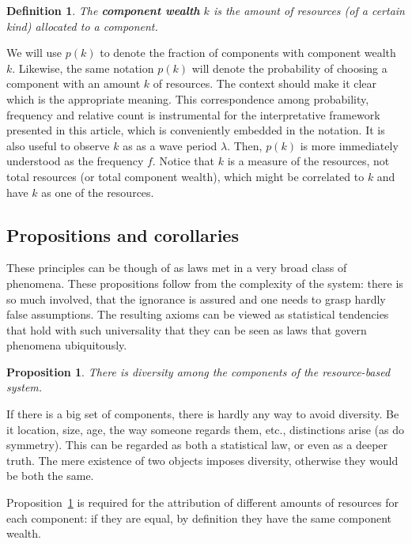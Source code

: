 \documentclass[a4paper, 11pt]{article} %
\newtheorem{proposition}[theorem]{Proposition}
\newtheorem{definition2}[theorem3]{Definition}
\begin{document}
\begin{definition2}
	The {\bf component wealth} $k$ is the amount of resources (of a certain kind) allocated to a component.
\end{definition2}

We will use $p(k)$ to denote the fraction of components with component wealth $k$.
Likewise, the same notation $p(k)$ will denote the probability of choosing a component with an amount $k$ of resources.
The context should make it clear which is the appropriate meaning.
This correspondence among probability, frequency and relative count is
instrumental for the interpretative framework presented in this article,
which is conveniently embedded in the notation.
It is also useful to observe 
$k$ as as a wave period $\lambda$.
Then, $p(k)$ is more immediately understood as 
the frequency $f$.
Notice that $k$ is a measure of the resources,
not total resources (or total component wealth), which
might be correlated to $k$ and have $k$ as one of the resources.



\subsection{Propositions and corollaries}

These principles can be though of as laws met in
a very broad class of phenomena.
These propositions follow from the complexity of the system:
there is so much involved, that the ignorance is assured and
one needs to grasp hardly false assumptions.
The resulting axioms can be viewed as statistical tendencies that
hold with such universality that they can be seen as laws
that govern phenomena ubiquitously.


\setcounter{theorem}{-1}
\begin{proposition}\label{prop:0}
	There is diversity among the components of the resource-based system.
\end{proposition}

If there is a big set of components, there is hardly any way to avoid diversity. Be it location, size, age, the way someone regards them, etc., distinctions arise (as do symmetry). This can be regarded as both a statistical law, or even as a deeper truth.
The mere existence of two objects imposes diversity,
otherwise they would be both the same.

Proposition~\ref{prop:0} is required for the attribution of different amounts of resources for each component:
if they are equal, by definition they have the same component wealth.
\end{document}
